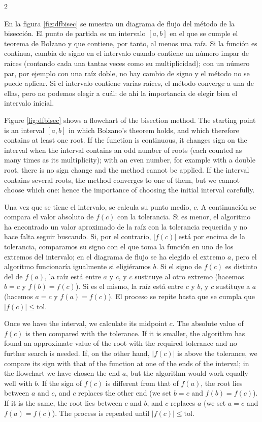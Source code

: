 \begin{paracol}{2}

En la figura \ref{fig:dfbisec} se muestra un diagrama de flujo del método de la bisección. El punto de partida es un intervalo $[a,b]$ en el que se cumple el teorema de Bolzano y que contiene, por tanto, al menos una raíz. Si la función es continua, cambia de signo en el intervalo cuando contiene un número impar de raíces (contando cada una tantas veces como su multiplicidad); con un número par, por ejemplo con una raíz doble, no hay cambio de signo y el método no se puede aplicar. Si el intervalo contiene varias raíces, el método converge a una de ellas, pero no podemos elegir a cuál: de ahí la importancia de elegir bien el intervalo inicial.

\switchcolumn

Figure \ref{fig:dfbisec} shows a flowchart of the bisection method. The starting point is an interval $[a,b]$ in which Bolzano's theorem holds, and which therefore contains at least one root. If the function is continuous, it changes sign on the interval when the interval contains an odd number of roots (each counted as many times as its multiplicity); with an even number, for example with a double root, there is no sign change and the method cannot be applied. If the interval contains several roots, the method converges to one of them, but we cannot choose which one: hence the importance of choosing the initial interval carefully.

\switchcolumn
 Una vez que se tiene el intervalo, se calcula su punto medio, $c$. A continuación se compara el valor absoluto de $f(c)$ con la tolerancia. Si es menor, el algoritmo ha encontrado un valor aproximado de la raíz con la tolerancia requerida y no hace falta seguir buscando. Si, por el contrario, $\vert f(c)\vert$ está por encima de la tolerancia, comparamos su signo con el que toma la función en uno de los extremos del intervalo; en el diagrama de flujo se ha elegido el extremo $a$, pero el algoritmo funcionaría igualmente si eligiéramos $b$. Si el signo de $f(c)$ es distinto del de $f(a)$, la raíz está entre $a$ y $c$, y $c$ sustituye al otro extremo (hacemos $b=c$ y $f(b)=f(c)$). Si es el mismo, la raíz está entre $c$ y $b$, y $c$ sustituye a $a$ (hacemos $a=c$ y $f(a)=f(c)$). El proceso se repite hasta que se cumpla que $\vert f(c)\vert\le \text{tol}$.

\switchcolumn

 Once we have the interval, we calculate its midpoint $c$. The absolute value of $f(c)$ is then compared with the tolerance. If it is smaller, the algorithm has found an approximate value of the root with the required tolerance and no further search is needed. If, on the other hand, $\vert f(c)\vert$ is above the tolerance, we compare its sign with that of the function at one of the ends of the interval; in the flowchart we have chosen the end $a$, but the algorithm would work equally well with $b$. If the sign of $f(c)$ is different from that of $f(a)$, the root lies between $a$ and $c$, and $c$ replaces the other end (we set $b=c$ and $f(b)=f(c)$). If it is the same, the root lies between $c$ and $b$, and $c$ replaces $a$ (we set $a=c$ and $f(a)=f(c)$). The process is repeated until $\vert f(c)\vert\le \text{tol}$.


\end{paracol}
